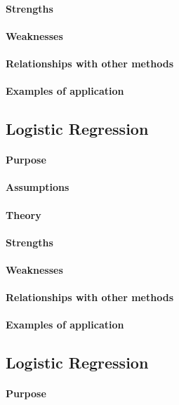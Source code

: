 \paragraph{Strengths}
\paragraph{Weaknesses}
\paragraph{Relationships with other methods}
\paragraph{Examples of application}

\subsection{Logistic Regression}
\paragraph{Purpose}
\paragraph{Assumptions}
\paragraph{Theory}
\paragraph{Strengths}
\paragraph{Weaknesses}
\paragraph{Relationships with other methods}
\paragraph{Examples of application}

\subsection{Logistic Regression}
\paragraph{Purpose}
